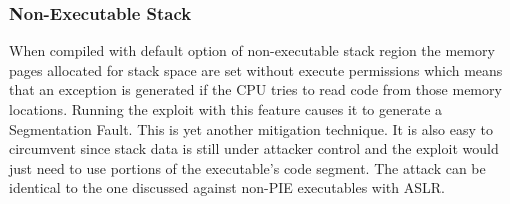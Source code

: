 \subsubsection { Non-Executable Stack }
When compiled with default option of non-executable stack region the memory pages allocated for stack space are set without execute permissions which means that an exception is generated if the CPU tries to read code from those memory locations. Running the exploit with this feature causes it to generate a Segmentation Fault. This is yet another mitigation technique. It is also easy to circumvent since stack data is still under attacker control and the exploit would just need to use portions of the executable's code segment. The attack can be identical to the one discussed against non-PIE executables with ASLR. \\
